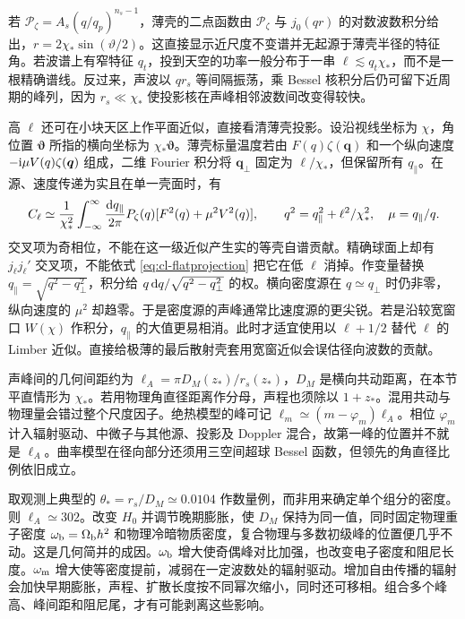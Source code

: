 若 $\mathcal P_\zeta=A_s(q/q_p)^{n_s-1}$，薄壳的二点函数由 $\mathcal P_\zeta$ 与 $j_0(qr)$ 的对数波数积分给出，$r=2\chi_*\sin(\vartheta/2)$。这直接显示近尺度不变谱并无起源于薄壳半径的特征角。若波谱上有窄特征 $q_t$，投到天空的功率一般分布于一串 $\ell\lesssim q_t\chi_*$，而不是一根精确谱线。反过来，声波以 $q r_s$ 等间隔振荡，乘 Bessel 核积分后仍可留下近周期的峰列，因为 $r_s\ll\chi_*$ 使投影核在声峰相邻波数间改变得较快。

高 $\ell$ 还可在小块天区上作平面近似，直接看清薄壳投影。设沿视线坐标为 $\chi$，角位置 $\bm\vartheta$ 所指的横向坐标为 $\chi_*\bm\vartheta$。薄壳标量温度若由 $F(q)\zeta(\bm q)$ 和一个纵向速度 $-\mathrm{i}\mu V(q)\zeta(\bm q)$ 组成，二维 Fourier 积分将 $\bm q_\perp$ 固定为 $\bm\ell/\chi_*$，但保留所有 $q_\parallel$。在源、速度传递为实且在单一壳面时，有
\begin{equation}\label{eq:cl-flatprojection}
 C_\ell\simeq\frac{1}{\chi_*^2}
       \int_{-\infty}^{\infty}\frac{\dd q_\parallel}{2\pi}
       P_\zeta(q)[F^2(q)+\mu^2 V^2(q)],\qquad
 q^2=q_\parallel^2+\ell^2/\chi_*^2,\quad \mu=q_\parallel/q .
\end{equation}
交叉项为奇相位，不能在这一级近似产生实的等壳自谱贡献。精确球面上却有 $j_\ell j_\ell'$ 交叉项，不能依式 \eqref{eq:cl-flatprojection} 把它在低 $\ell$ 消掉。作变量替换 $q_\parallel=\sqrt{q^2-q_\perp^2}$，积分给 $q\,\dd q/\sqrt{q^2-q_\perp^2}$ 的权。横向密度源在 $q\simeq q_\perp$ 时仍非零，纵向速度的 $\mu^2$ 却趋零。于是密度源的声峰通常比速度源的更尖锐。若是沿较宽窗口 $W(\chi)$ 作积分，$q_\parallel$ 的大值更易相消。此时才适宜使用以 $\ell+1/2$ 替代 $\ell$ 的 Limber 近似。直接给极薄的最后散射壳套用宽窗近似会误估径向波数的贡献。

声峰间的几何间距约为 $\ell_A=\pi D_M(z_*)/r_s(z_*)$，$D_M$ 是横向共动距离，在本节平直情形为 $\chi_*$。若用物理角直径距离作分母，声程也须除以 $1+z_*$。混用共动与物理量会错过整个尺度因子。绝热模型的峰可记 $\ell_m\simeq(m-\varphi_m)\ell_A$。相位 $\varphi_m$ 计入辐射驱动、中微子与其他源、投影及 Doppler 混合，故第一峰的位置并不就是 $\ell_A$。曲率模型在径向部分还须用三空间超球 Bessel 函数，但领先的角直径比例依旧成立。

取观测上典型的 $\theta_*=r_s/D_M\simeq0.0104$ 作数量例，而非用来确定单个组分的密度。则 $\ell_A\simeq302$。改变 $H_0$ 并调节晚期膨胀，使 $D_M$ 保持为同一值，同时固定物理重子密度 $\omega_{\rm b}=\Omega_{\rm b}h^2$ 和物理冷暗物质密度，复合物理与多数初级峰的位置便几乎不动。这是几何简并的成因。$\omega_{\rm b}$ 增大使奇偶峰对比加强，也改变电子密度和阻尼长度。$\omega_{\rm m}$ 增大使等密度提前，减弱在一定波数处的辐射驱动。增加自由传播的辐射会加快早期膨胀，声程、扩散长度按不同幂次缩小，同时还可移相。组合多个峰高、峰间距和阻尼尾，才有可能剥离这些影响。

